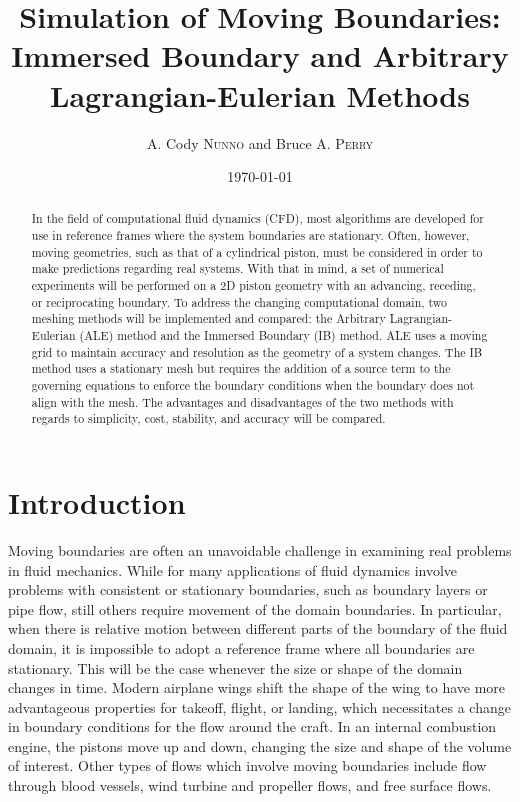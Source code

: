 \documentclass{article}
\title{Simulation of Moving Boundaries: Immersed Boundary and Arbitrary Lagrangian-Eulerian Methods} %
\author{A. Cody \textsc{Nunno} and Bruce A. \textsc{Perry}} %
\date{\today} %
\begin{document}
\maketitle %


\begin{abstract}
In the field of computational fluid dynamics (CFD), most algorithms are developed for use in reference frames where the system boundaries are stationary.  Often, however, moving geometries, such as that of a cylindrical piston, must be considered in order to make predictions regarding real systems.  With that in mind, a set of numerical experiments will be performed on a 2D piston geometry with an advancing, receding, or reciprocating boundary.  To address the changing computational domain, two meshing methods will be implemented and compared: the Arbitrary Lagrangian-Eulerian (ALE) method and the Immersed Boundary (IB) method.  ALE uses a moving grid to maintain accuracy and resolution as the geometry of a system changes.  The IB method uses a stationary mesh but requires the addition of a source term to the governing equations to enforce the boundary conditions when the boundary does not align with the mesh. The advantages and disadvantages of the two methods with regards to simplicity, cost, stability, and accuracy will be compared.
\end{abstract}


\section{Introduction}

Moving boundaries are often an unavoidable challenge in examining real problems in fluid mechanics.  While for many applications of fluid dynamics involve problems with consistent or stationary boundaries, such as boundary layers or pipe flow, still others require movement of the domain boundaries. In particular, when there is relative motion between different parts of the boundary of the fluid domain, it is impossible to adopt a reference frame where all boundaries are stationary. This will be the case whenever the size or shape of the domain changes in time.  Modern airplane wings shift the shape of the wing to have more advantageous properties for takeoff, flight, or landing, which necessitates a change in boundary conditions for the flow around the craft.  In an internal combustion engine, the pistons move up and down, changing the size and shape of the volume of interest. Other types of flows which involve moving boundaries include flow through blood vessels, wind turbine and propeller flows, and free surface flows. 
\end{document}
